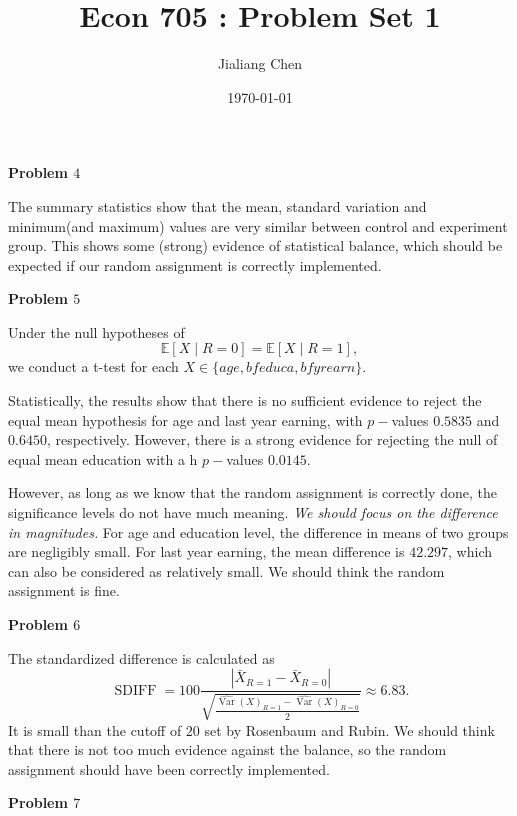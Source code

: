 \documentclass[11pt,a4paper]{amsart}
\theoremstyle{plain}
\theoremstyle{definition}
\begin{document}
\title{Econ 705 : Problem Set 1}
\author{Jialiang Chen} 
\date{\today}
\maketitle

\textbf{Problem $4$}\hfil

The summary statistics show that the mean, standard variation and minimum(and maximum) values are very similar between control and experiment group. This shows some (strong) evidence of statistical balance, which should be expected if our random assignment is correctly implemented.

\vspace{10pt}

\textbf{Problem $5$}\hfil

Under the null hypotheses of 
\[	\mathbb{E}[X \mid R = 0] = \mathbb{E}[X \mid R = 1], 	\]
we conduct a t-test for each $X \in \{age, bfeduca, bfyrearn\}$. 

Statistically, the results show that there is no sufficient evidence to reject the equal mean hypothesis for age and last year earning, with $p-$values $0.5835$ and $0.6450$, respectively. However, there is a strong evidence for rejecting the null of equal mean education with a h $p-$values $0.0145$.  

However, as long as we know that the random assignment is correctly done, the significance levels do not have much meaning. \emph{We should focus on the difference in magnitudes.} For age and education level, the difference in means of two groups are negligibly small. For last year earning, the mean difference is $42.297$, which can also be considered as relatively small. We should think the random assignment is fine.

\vspace{10pt}

\textbf{Problem $6$}\hfil

The standardized difference is calculated as 
\[	\operatorname{SDIFF} = 100 \frac{\left|\bar{X}_{R = 1} - \bar{X}_{R=0}\right|}{\sqrt{\frac{\widehat{\operatorname{Var}}(X)_{R=1}  - \widehat{\operatorname{Var}}(X)_{R=0} }{2}}} \approx 6.83. \]
It is small than the cutoff of $20$ set by Rosenbaum and Rubin. We should think that there is not too much evidence against the balance, so the random assignment should have been correctly implemented.

\vspace{10pt}

\textbf{Problem $7$}\hfil
\end{document}
